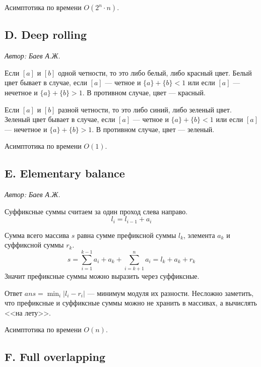 \documentclass[10pt, a4paper]{article}
\newcommand{\problemauthor}[1]{
\begin{flushright}
\textit{Автор: #1}
\end{flushright}
}
\begin{document}
Асимптотика по времени $O(2^n \cdot n)$.






\subsection*{D. Deep rolling}

\problemauthor{ Баев А.Ж.}



Если $[a]$ и $[b]$ одной четности, то это либо белый, либо красный цвет. Белый цвет бывает в случае, если $[a]$ --- четное и $\{a\} + \{b\} < 1$ или если $[a]$ --- нечетное и $\{a\} + \{b\} > 1$. В противном случае, цвет --- красный.

Если $[a]$ и $[b]$ разной четности, то это либо синий, либо зеленый цвет. Зеленый цвет бывает в случае, если $[a]$ --- четное и $\{a\} + \{b\} < 1$ или если $[a]$ --- нечетное и $\{a\} + \{b\} > 1$. В противном случае, цвет --- зеленый.

Асимптотика по времени $O(1)$.






\subsection*{E. Elementary balance}

\problemauthor{ Баев А.Ж.}

Суффиксные суммы считаем за один проход слева направо. 
$$l_i = l_{i - 1} + a_i$$

Сумма всего массива $s$ равна сумме префиксной суммы $l_k$, элемента $a_k$ и суффиксной суммы $r_k$.
$$s = \sum_{i=1}^{k - 1} a_i + a_k + \sum_{i=k + 1}^{n} a_i = l_k + a_k + r_k $$
Значит префиксные суммы можно выразить через суффиксные.

Ответ $ans = \min_i |l_i - r_i|$ --- минимум модуля их разности. Несложно заметить, что префиксные и суффиксные суммы можно не хранить в массивах, а вычислять <<на лету>>.

Асимптотика по времени $O(n)$.






\subsection*{F. Full overlapping}
\end{document}
